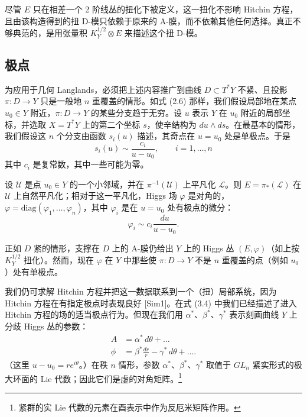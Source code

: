 尽管 $E$ 只在相差一个 2 阶线丛的扭化下被定义，这一扭化不影响 Hitchin 方程，且由该构造得到的扭 D-模只依赖于原来的 A-膜，而不依赖其他任何选择。真正不够典范的，是用张量积 $K_Y^{1/2}\otimes E$ 来描述这个扭 D-模。

\subsection{极点}

为应用于几何 Langlands，必须把上述内容推广到曲线 $D\subset T^*Y$ 不紧、且投影 $\pi:D\to Y$ 只是一般地 $n$ 重覆盖的情形。如式 (2.6) 那样，我们假设局部地在某点 $u_0\in Y$ 附近，$\pi:D\to Y$ 的某些分支趋于无穷。设 $u$ 表示 $Y$ 在 $u_0$ 附近的局部坐标，并选取 $X=T^*Y$ 上的第二个坐标 $s$，使辛结构为 $du\wedge ds$。在最基本的情形，我们假设这 $n$ 个分支由函数 $s_i(u)$ 描述，其奇点在 $u=u_0$ 处是单极点。于是
\begin{equation}\tag{4.4}
s_i(u)\sim\frac{c_i}{u-u_0},\qquad i=1,\dots,n
\end{equation}
其中 $c_i$ 是复常数，其中一些可能为零。

设 $\mathcal{U}$ 是点 $u_0\in Y$ 的一个小邻域，并在 $\pi^{-1}(\mathcal{U})$ 上平凡化 $\mathcal{L}$。则 $E=\pi_*(\mathcal{L})$ 在 $\mathcal{U}$ 上自然平凡化；相对于这一平凡化，Higgs 场 $\varphi$ 是对角的，$\varphi=\mathrm{diag}(\varphi_1,\dots,\varphi_n)$，其中 $\varphi_i$ 是在 $u=u_0$ 处有极点的微分：
\begin{equation}\tag{4.5}
\varphi_i\sim c_i\frac{du}{u-u_0}.
\end{equation}

正如 $D$ 紧的情形，支撑在 $D$ 上的 A-膜仍给出 $Y$ 上的 Higgs 丛 $(E,\varphi)$（如上按 $K_Y^{1/2}$ 扭化）。然而，现在 $\varphi$ 在 $Y$ 中那些使 $\pi:D\to Y$ 不是 $n$ 重覆盖的点（例如 $u_0$）处有单极点。

我们仍可求解 Hitchin 方程并把这一数据联系到一个（扭）局部系统，因为 Hitchin 方程在有指定极点时表现良好 [Sim1]。在式 (3.4) 中我们已经描述了进入 Hitchin 方程的场的适当极点行为。但现在我们用 $\alpha^*$、$\beta^*$、$\gamma^*$ 表示刻画曲线 $Y$ 上分歧 Higgs 丛的参数：
\begin{equation}\tag{4.6}
\begin{aligned}
A&=\alpha^*\,d\theta+\dots\\
\phi&=\beta^*\frac{dr}{r}-\gamma^*\,d\theta+\dots.
\end{aligned}
\end{equation}
（这里 $u-u_0=re^{i\theta}$。）在秩 $n$ 情形，参数 $\alpha^*$、$\beta^*$、$\gamma^*$ 取值于 $GL_n$ 紧实形式的极大环面的 Lie 代数；因此它们是虚的对角矩阵。\footnote{紧群的实 Lie 代数的元素在酉表示中作为反厄米矩阵作用。}

